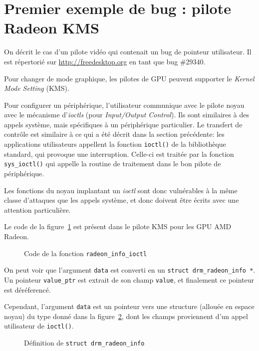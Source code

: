 \section{Premier exemple de bug : pilote Radeon KMS}

On décrit le cas d'un pilote vidéo qui contenait un bug de pointeur utilisateur.
Il est répertorié sur \url{http://freedesktop.org} en tant que bug \#29340.

Pour changer de mode graphique, les pilotes de GPU peuvent supporter le
\emph{Kernel Mode Setting} (KMS).

Pour configurer un périphérique, l'utilisateur communique avec le pilote noyau
avec le mécanisme d'\emph{ioctls} (pour \emph{Input/Output Control}).
Ils sont similaires à des appels système, mais spécifiques à un périphérique
particulier. Le transfert de contrôle est similaire à ce qui a été décrit dans
la section précédente: les applications utilisateurs appellent la fonction
\texttt{ioctl()} de la bibliothèque standard, qui provoque une interruption.
Celle-ci est traitée par la fonction \texttt{sys\_ioctl()} qui appelle la
routine de traitement dans le bon pilote de périphérique.

Les fonctions du noyau implantant un \emph{ioctl} sont donc vulnérables à la
même classe d'attaques que les appels système, et donc doivent être écrits avec
une attention particulière.

Le code de la figure~\ref{fig:kms-buggy} est présent dans le pilote KMS pour les
GPU AMD Radeon.

\begin{figure}[h]
\caption{Code de la fonction \texttt{radeon\_info\_ioctl}}
\label{fig:kms-buggy}
\end{figure}

On peut voir que l'argument \texttt{data} est converti en un \texttt{struct
drm\_radeon\_info *}. Un pointeur \texttt{value\_ptr} est extrait de son champ
\texttt{value}, et finalement ce pointeur est déréferencé.

Cependant, l'argument \texttt{data} est un pointeur vers une structure (allouée
en espace noyau) du type donné dans la figure~\ref{fig:kms-info}, dont les
champs proviennent d'un appel utilisateur de \verb!ioctl()!.

\begin{figure}[h]
\caption{Définition de \texttt{struct drm\_radeon\_info}}
\label{fig:kms-info}
\end{figure}

